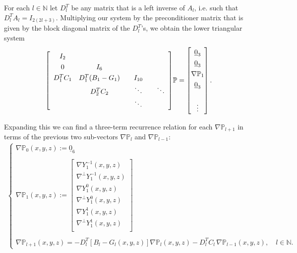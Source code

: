 \documentclass[11pt, oneside]{article}   	%
\newcommand{\N}{\mathbb{N}}
\newcommand{\bigP}{\mathbb{P}}
\newcommand{\gradP}{\nabla\mathbb{P}}
\newcommand{\gradPl}{\nabla\mathbb{P}_l}
\newcommand{\gradY}{\nabla Y}
\newcommand{\gradpY}{\nabla^\perp Y}
\newcommand{\Dlt}{D^T_l}
\begin{document}
For each \(l \in \N\) let \(\Dlt\) be any matrix that is a left inverse of \(A_l\), i.e. such that \(\Dlt A_l = I_{2(2l+3)}\). Multiplying our system by the preconditioner matrix that is given by the block diagonal matrix of the \(\Dlt\)'s, we obtain the lower triangular system
\begin{align}
\renewcommand\arraystretch{1.3}
\mleft[
\begin{array}{cccc}
		I_2 \\
		0 & I_6 & & \\
		D^T_1 C_1 & D^T_1(B_1-G_1) & \quad I_{10} \quad & \\
		& D^T_2 C_2 & \ddots & \ddots \\
		& & \ddots &
\end{array}
\mright]
\bigP
=
\begin{bmatrix}
	\underline{0}_3 \\ \underline{0}_3 \\ \gradP_1 \\ \underline{0}_3 \\ \\ \vdots \\
\end{bmatrix}.
\end{align}

Expanding this we can find a three-term recurrence relation for each \(\gradP_{l+1}\) in terms of the previous two sub-vectors \(\gradPl\) and \(\gradP_{l-1}\):
\begin{align}
\begin{cases}
\gradP_{0}(x,y,z) := \underline{0}_6 \\
\\
\gradP_{1}(x,y,z) := \begin{bmatrix}
				\gradY_1^{-1}(x,y,z) \\ \gradpY_1^{-1}(x,y,z) \\ \gradY_1^{0}(x,y,z) \\ \gradpY_1^{0}(x,y,z) \\ \gradY_1^{1}(x,y,z) \\ \gradpY_1^{1}(x,y,z) \\
			\end{bmatrix} \\
\\
\gradP_{l+1}(x,y,z) = -\Dlt [B_l-G_l(x,y,z)] \gradPl(x,y,z) - \Dlt C_l  \,\gradP_{l-1}(x,y,z), \quad l \in \N.
\end{cases}
\end{align}
\end{document}
